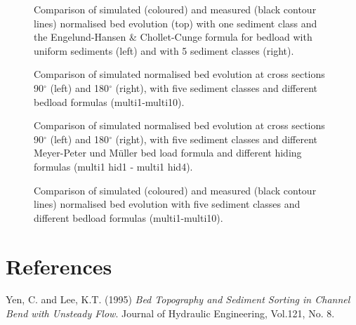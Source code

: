\begin{figure} [!h]
\centering
{}
\caption{Comparison of simulated (coloured) and measured (black contour lines) normalised bed evolution (top)
with one sediment class and the Engelund-Hansen \& Chollet-Cunge
  formula for bedload with uniform sediments (left) and with 5 sediment classes (right).}\label{fig:results_vf}
\end{figure}

\begin{figure} [!h]
\centering
{}
\caption{Comparison of simulated normalised bed evolution at cross sections 90$^{\circ}$ (left) and 180$^{\circ}$ (right),
with five sediment classes and different bedload formulas (multi1-multi10).}\label{fig:results_multi1}
\end{figure}

\begin{figure} [!h]
\centering
{}
\caption{Comparison of simulated normalised bed evolution at cross sections 90$^{\circ}$ (left) and 180$^{\circ}$ (right),
  with five sediment classes and different Meyer-Peter und Müller bed load formula and different hiding formulas (multi1 hid1 - multi1 hid4).}
\label{fig:results_multi2}
\end{figure}

\begin{figure} [!h]
\centering
{}
\caption{Comparison of simulated (coloured) and measured (black contour lines) normalised bed evolution with five sediment classes and different bedload formulas (multi1-multi10).}\label{fig:results_multi3}
\end{figure}


\section{References}
%
Yen, C. and Lee, K.T. (1995) \textit{ Bed Topography and Sediment Sorting in Channel Bend
with Unsteady Flow}. Journal of Hydraulic Engineering, Vol.121, No. 8.
